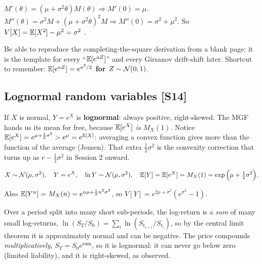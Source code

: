 \documentclass[10pt]{article}
\begin{document}
\begin{where}
\end{where}
\begin{worked}
$M'(\theta)=(\mu+\sigma^2\theta)M(\theta)\Rightarrow M'(0)=\mu$. $M''(\theta)=\sigma^2M+(\mu+\sigma^2\theta)^2M\Rightarrow M''(0)=\sigma^2+\mu^2$. So $V[X]=\mathbb{E}[X^2]-\mu^2=\sigma^2$ \checkmark.
\end{worked}
\begin{exam}
Be able to reproduce the completing-the-square derivation from a blank page: it is the template for every ``$\mathbb{E}[e^{aZ}]$'' and every Girsanov drift-shift later. Shortcut to remember: \textbf{$\mathbb{E}[e^{aZ}]=e^{a^2/2}$ for $Z\sim\mathcal{N}(0,1)$}.
\end{exam}

\subsection{Lognormal random variables [S14]}
\begin{idea}
If $X$ is normal, $Y=e^X$ is \textbf{lognormal}: always positive, right-skewed. The MGF hands us its mean for free, because $\mathbb{E}[e^X]$ \emph{is} $M_X(1)$. Notice $\mathbb{E}[e^X]=e^{\mu+\frac12\sigma^2}>e^{\mu}=e^{\mathbb{E}[X]}$: averaging a convex function gives more than the function of the average (Jensen). That extra $\frac12\sigma^2$ is the convexity correction that turns up as $r-\frac12\sigma^2$ in Session 2 onward.
\end{idea}
\[X\sim\mathcal{N}(\mu,\sigma^2),\quad Y=e^X,\quad \ln Y\sim\mathcal{N}(\mu,\sigma^2),\quad \mathbb{E}[Y]=\mathbb{E}[e^X]=M_X(1)=\exp\Big(\mu+\tfrac12\sigma^2\Big).\]
\begin{where}
\end{where}
\beyond{} Also $\mathbb{E}[Y^n]=M_X(n)=e^{n\mu+\frac12n^2\sigma^2}$, so $V[Y]=e^{2\mu+\sigma^2}(e^{\sigma^2}-1)$.
\begin{worked}
Over a period split into many short sub-periods, the log-return is a \emph{sum} of many small log-returns, $\ln(S_T/S_0)=\sum_i\ln(S_{t_{i+1}}/S_{t_i})$, so by the central limit theorem it is approximately normal and can be negative. The price compounds \emph{multiplicatively}, $S_T=S_0e^{\text{sum}}$, so it is lognormal: it can never go below zero (limited liability), and it is right-skewed, as observed.
\end{worked}
\end{document}
